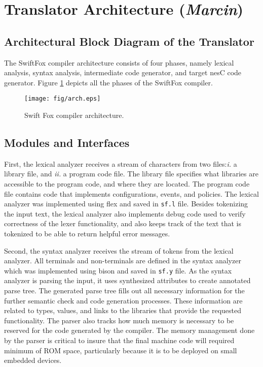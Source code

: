 \section{Translator Architecture (\textit{Marcin})}

\subsection{Architectural Block Diagram of the Translator}

The SwiftFox compiler architecture consists of four phases, namely 
lexical analysis, syntax analysis, intermediate code generator, and target 
nesC code generator. Figure \ref{fig:arch} depicts all the phases of the
SwiftFox compiler.

\begin{figure}[htp]
\centering
        \texttt{[image: fig/arch.eps]}
        \caption{Swift Fox compiler architecture.}
        \label{fig:arch}
\end{figure}

\subsection{Modules and Interfaces}

First, the lexical analyzer receives a stream of characters from two 
files:\textit{i.} a library file, and \textit{ii.} a program code file. The
library file specifies what libraries are accessible to the program code,
and where they are located. The program code file contains code that
implements configurations, events, and policies. The lexical analyzer was
implemented using flex \cite{paxson:2010} and saved in \texttt{sf.l} file. 
Besides tokenizing the input text, the lexical analyzer also implements
debug code used to verify correctness of the lexer functionality, and also 
keeps track of the text that is tokenized to be able to return helpful
error messages.

Second, the syntax analyzer receives the stream of tokens from 
the lexical analyzer. All terminals and non-terminals are 
defined in the syntax analyzer which was implemented using
bison \cite{bison:2010} and saved in \texttt{sf.y} file. As the syntax
analyzer is parsing the input, it uses synthesized attributes to create
annotated parse tree. The generated parse tree fills out all necessary information
for the further semantic check and code generation processes.
These information are related to types, values, and links to
the libraries that provide the requested functionality. The parser
also tracks how much memory is necessary to be reserved for the
code generated by the compiler. The memory management done
by the parser is critical to insure that the final machine
code will required minimum of ROM space, particularly because it 
is to be deployed on small embedded devices. 

